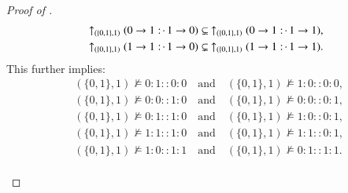 \documentclass[11pt]{amsart}
\theoremstyle{definition} %
\newcommand{\righttherefore}{:\joinrel\cdot\,}
\begin{document}
\begin{proof}[Proof of ]
\begin{align*}
	&\uparrow_{(\{0,1\},1)}(0\to 1\righttherefore 1\to 0)\subsetneq\ \uparrow_{(\{0,1\},1)}(0\to 1\righttherefore 1\to 1),\\
	&\uparrow_{(\{0,1\},1)}(1\to 1\righttherefore 1\to 0)\subsetneq\ \uparrow_{(\{0,1\},1)}(1\to 1\righttherefore 1\to 1).
\end{align*} This further implies:
\begin{align} 
	\label{equ:B1_notmodels_0100_1000} &(\{0,1\},1)\not\models 0:1::0:0 \quad\text{and}\quad (\{0,1\},1)\not\models 1:0::0:0,\\
	\label{equ:B1_notmodels_0010_0001} &(\{0,1\},1)\not\models 0:0::1:0 \quad\text{and}\quad (\{0,1\},1)\not\models 0:0::0:1,\\ 
	\label{equ:B1_notmodels_0110_1001} &(\{0,1\},1)\not\models 0:1::1:0 \quad\text{and}\quad (\{0,1\},1)\not\models 1:0::0:1,\\ 
	\label{equ:B1_notmodels_1110_1101} &(\{0,1\},1)\not\models 1:1::1:0 \quad\text{and}\quad (\{0,1\},1)\not\models 1:1::0:1,\\
	\label{equ:B1_notmodels_1011_0111} &(\{0,1\},1)\not\models 1:0::1:1 \quad\text{and}\quad (\{0,1\},1)\not\models 0:1::1:1.
\end{align}\\


\end{proof}
\end{document}
